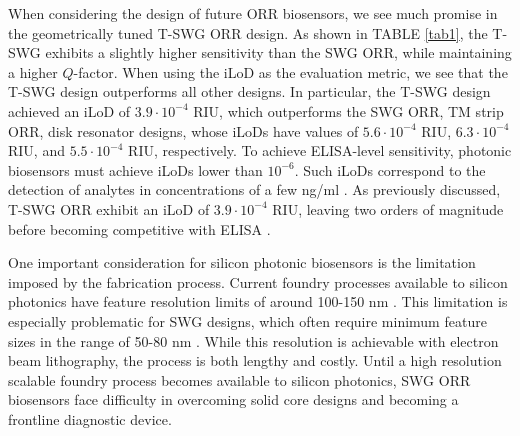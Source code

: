 \documentclass[aps,prl,twocolumn, superscriptaddress,nobalancelastpage]{revtex4}
\begin{document}
When considering the design of future ORR biosensors, we see much promise in the geometrically tuned T-SWG ORR design. As shown in TABLE \ref{tab1}, the T-SWG exhibits a slightly higher sensitivity than the SWG ORR, while maintaining a higher $Q$-factor. When using the iLoD as the evaluation metric, we see that the T-SWG design outperforms all other designs. In particular, the T-SWG design \cite{TSWGbio} achieved an iLoD of $3.9\cdot 10^{-4}$ RIU, which outperforms the SWG ORR, TM strip ORR, disk resonator designs, whose iLoDs have values of $5.6 \cdot 10^{-4}$ RIU, $6.3\cdot 10^{-4}$ RIU, and $5.5 \cdot 10^{-4}$ RIU, respectively. To achieve ELISA-level sensitivity, photonic biosensors must achieve iLoDs lower than $10^{-6}$. Such iLoDs correspond to the detection of analytes in concentrations of a few ng/ml \cite{LoDPhotonicBiosensors}. As previously discussed, T-SWG ORR exhibit an iLoD of $3.9 \cdot 10^{-4}$ RIU, leaving two orders of magnitude before becoming competitive with ELISA \cite{ELISAlimit}.



One important consideration for silicon photonic biosensors is the limitation imposed by the fabrication process. Current foundry processes available to silicon photonics have feature resolution limits of around 100-150 nm \cite{cmos}. This limitation is especially problematic for SWG designs, which often require minimum feature sizes in the range of 50-80 nm \cite{swg1}. While this resolution is achievable with electron beam lithography, the process is both lengthy and costly. Until a high resolution scalable foundry process becomes available to silicon photonics, SWG ORR biosensors face difficulty in overcoming solid core designs and becoming a frontline diagnostic device. 
\end{document}
